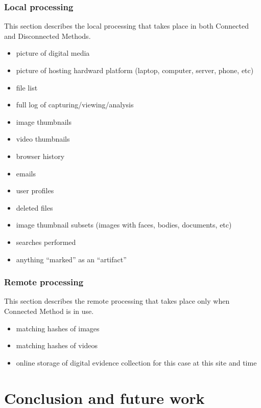 \documentclass[12pt]{article}
\begin{document}
\subsubsection{Local processing}

This section describes the local processing that takes place in both Connected and Disconnected Methods.
\begin{itemize}
  \item picture of digital media
  \item picture of hosting hardward platform (laptop, computer, server, phone, etc)
  \item file list
  \item full log of capturing/viewing/analysis
  \item image thumbnails
  \item video thumbnails
  \item browser history
  \item emails
  \item user profiles
  \item deleted files
  \item image thumbnail subsets (images with faces, bodies, documents, etc)
  \item searches performed
  \item anything ``marked'' as an ``artifact''
\end{itemize}

\subsubsection{Remote processing}

This section describes the remote processing that takes place only when Connected Method is in use.
\begin{itemize}
  \item matching hashes of images
  \item matching hashes of videos
  \item online storage of digital evidence collection for this case at this site and time
\end{itemize}

\newpage
\section{Conclusion and future work}
\end{document}
